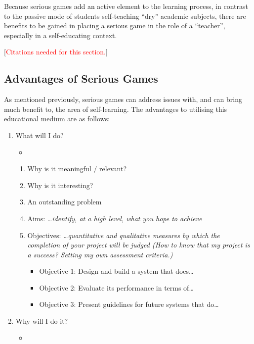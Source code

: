 \documentclass[a4paper]{article}
\newcommand{\comment}[1]{[\textcolor{red}{#1}]} %
\begin{document}
Because serious games add an active element to the learning process, in contrast to the passive mode of students self-teaching ``dry'' academic subjects, there are benefits to be gained in placing a serious game in the role of a ``teacher'', especially in a self-educating context.

\comment{Citations needed for this section.}

\subsection{Advantages of Serious Games}
As mentioned previously, serious games can address issues with, and can bring much benefit to, the area of self-learning. The advantages to utilising this educational medium are as follows:
\begin{enumerate}
  \item What will I do?
    \begin{itemize}
      \item {}
    \end{itemize}
    \begin{enumerate}
      \item Why is it meaningful / relevant?
      \item Why is it interesting?
      \item An outstanding problem
      \item Aims: \textit{\dots identify, at a high level, what you hope to achieve}
      \item Objectives: \textit{\dots quantitative and qualitative measures by which the completion of your project will be judged (How to know that my project is a success? Setting my own assessment criteria.)}
        \begin{itemize}
          \item Objective 1: Design and build a system that does\dots
          \item Objective 2: Evaluate its performance in terms of\dots
          \item Objective 3: Present guidelines for future systems that do\dots
        \end{itemize}
    \end{enumerate}
  \item Why will I do it?
    \begin{itemize}
      \item {}

\end{itemize}
\end{enumerate}
\end{document}
